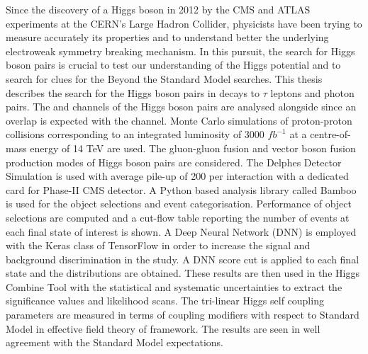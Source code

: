 Since the discovery of a Higgs boson in 2012 by the CMS and ATLAS experiments at the CERN's Large Hadron Collider, physicists have been trying to measure accurately its properties and to understand better the underlying electroweak symmetry breaking mechanism. In this pursuit, the search for Higgs boson pairs is crucial to test our understanding of the Higgs potential and to search for clues for the Beyond the Standard Model searches. This thesis describes the search for the Higgs boson pairs in decays to $\tau$ leptons and photon pairs. The \wwgg and \zzgg channels of the Higgs boson pairs are analysed alongside since an overlap is expected with the \ttgg channel. Monte Carlo simulations of proton-proton collisions corresponding to an integrated luminosity of 3000 $fb^{-1}$  at a centre-of-mass energy of 14 TeV are used. The gluon-gluon fusion and vector boson fusion production modes of Higgs boson pairs are considered. The Delphes Detector Simulation is used with average pile-up of 200 per interaction with a dedicated card for Phase-II CMS detector. A Python based analysis library called Bamboo is used for the object selections and event categorisation. Performance of object selections are computed and a cut-flow table reporting the number of events at each final state of interest is shown. A Deep Neural Network (DNN) is employed with the Keras class of TensorFlow in order to increase the signal and background discrimination in the study. A DNN score cut is applied to each final state and the distributions are obtained. These results are then used in the Higgs Combine Tool with the statistical and systematic uncertainties to extract the significance values and likelihood scans. The tri-linear Higgs self coupling parameters are measured in terms of coupling modifiers with respect to Standard Model in effective field theory of \kl framework. The results are seen in well agreement with the Standard Model expectations.